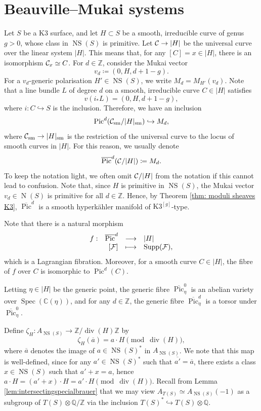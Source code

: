 \documentclass[11pt,twoside]{amsart}
\numberwithin{equation}{section}
\theoremstyle{definition}
\theoremstyle{plain}
\newcommand{\Z}{\ensuremath{\mathbb{Z}}}
\newcommand{\spec}{\ensuremath{\operatorname{Spec}}}
\newcommand{\Q}{\ensuremath{\mathbb{Q}}}
\newcommand{\CC}{\ensuremath{\mathbb{C}}}
\def\NS{\operatorname{NS}}
\def\Pic{\operatorname{Pic}}
\def\olPic{\overline{\operatorname{Pic}}}
\def\ol{\overline}
\def\N{\operatorname{N}}
\def\dv{\operatorname{div}}
\begin{document}
\section{Beauville--Mukai systems}

Let $S$ be a K3 surface, and let $H\subset S$ be a smooth, irreducible curve of genus $g>0$, whose class in $\NS(S)$ is primitive. 
Let $\mathcal{C}\to |H|$ be the universal curve over the linear system $|H|$. 
This means that, for any $[C]=x\in |H|$, there is an isomorphism $\mathcal{C}_x\simeq C$.
For $d\in \Z$, consider the Mukai vector 
\begin{equation}\label{eq:vd}
    v_d \coloneqq (0,H,d+1-g).
\end{equation}
For a $v_d$-generic polarisation $H'\in \NS(S)$, we write $M_d = M_{H'}(v_d)$. 
Note that a line bundle $L$ of degree $d$ on a smooth, irreducible curve $C\in |H|$ satisfies $$v(i_*L) = (0,H,d+1-g),$$ where $i:C\hookrightarrow S$ is the inclusion.
Therefore, we have an inclusion $$\Pic^d(\calC_{\operatorname{sm}}/|H|_{\operatorname{sm}})\hookrightarrow M_d,$$ where $\mathcal{C}_{\operatorname{sm}}\to |H|_{\operatorname{sm}}$ is the restriction of the universal curve to the locus of smooth curves in $|H|$. 
For this reason, we usually denote $$\olPic^d(\calC/|H|)\coloneqq M_d.$$
To keep the notation light, we often omit $\mathcal{C}/|H|$ from the notation if this cannot lead to confusion. Note that, since $H$ is primitive in $\NS(S)$, the Mukai vector $v_d\in \N(S)$ is primitive for all $d\in \Z$. Hence, by Theorem \ref{thm: moduli sheaves K3}, $\olPic^d$ is a smooth hyperk\"ahler manifold of $\text{K3}^{[g]}$-type.

Note that there is a natural morphism 
$$\fonction{f}{\olPic^d}{|H|}{[\calF]}{\operatorname{Supp}(\calF),}$$
which is a Lagrangian fibration. Moreover, for a smooth curve $C\in |H|$, the fibre of $f$ over $C$ is isomorphic to $\Pic^d(C)$.

Letting $\eta\in |H|$ be the generic point, the generic fibre $\olPic^0_\eta$ is an abelian variety over $\spec(\CC(\eta))$, and for any $d\in \Z$, the generic fibre $\olPic^d_\eta$ is a torsor under $\olPic^0_\eta$.  

Define $\zeta_H: A_{\NS(S)}\to \Z/\dv(H)\Z$ by $$\zeta_{H}(\ol{a}) = a\cdot H\pmod {\dv(H)},$$ where $\ol{a}$ denotes the image of $a\in \NS(S)^*$ in $A_{\NS(S)}$. We note that this map is well-defined, since for any $a'\in \NS(S)^*$ such that $\ol{a'}=\ol{a}$, there exists a class $x\in \NS(S)$ such that $a'+x = a$, hence $a\cdot H = (a'+x)\cdot H = a'\cdot H \pmod{\dv(H)}$.
Recall from Lemma \ref{lem:intersectingspecialbrauer} that we may view $A_{T(S)}\simeq A_{\NS(S)}(-1)$ as a subgroup of $T(S)\otimes \Q/\Z$ via the inclusion $T(S)^*\hookrightarrow T(S)\otimes \Q$. 
\end{document}
